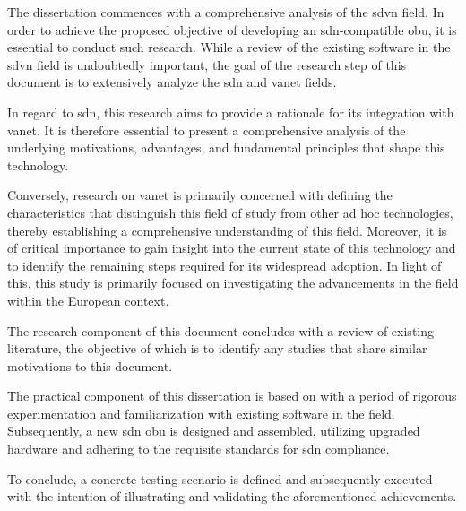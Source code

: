 The dissertation commences with a comprehensive analysis of the \gls{sdvn} field. In order to achieve the proposed objective of developing an \gls{sdn}-compatible \gls{obu}, it is essential to conduct such research. While a review of the existing software in the \gls{sdvn} field is undoubtedly important, the goal of the research step of this document is to extensively analyze the \gls{sdn} and \gls{vanet} fields.

In regard to \gls{sdn}, this research aims to provide a rationale for its integration with \gls{vanet}. It is therefore essential to present a comprehensive analysis of the underlying motivations, advantages, and fundamental principles that shape this technology.

Conversely, research on \gls{vanet} is primarily concerned with defining the characteristics that distinguish this field of study from other ad hoc technologies, thereby establishing a comprehensive understanding of this field. Moreover, it is of critical importance to gain insight into the current state of this technology and to identify the remaining steps required for its widespread adoption. In light of this, this study is primarily focused on investigating the advancements in the field within the European context.

The research component of this document concludes with a review of existing literature, the objective of which is to identify any studies that share similar motivations to this document.

The practical component of this dissertation is based on with a period of rigorous experimentation and familiarization with existing software in the field. Subsequently, a new \gls{sdn} \gls{obu} is designed and assembled, utilizing upgraded hardware and adhering to the requisite standards for \gls{sdn} compliance.

To conclude, a concrete testing scenario is defined and subsequently executed with the intention of illustrating and validating the aforementioned achievements.


